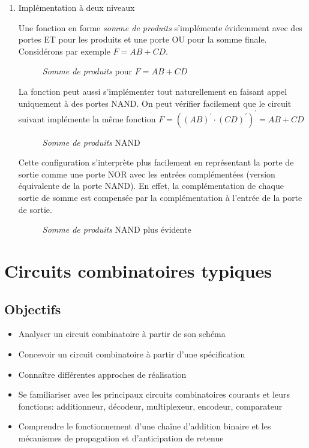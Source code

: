 \documentclass[letter, oneside]{book}
\begin{document}
\begin{enumerate}
\item Implémentation à deux niveaux
\label{sec:orgac7359b}

Une fonction en forme \emph{somme de produits} s'implémente évidemment avec
des portes ET pour les produits et une porte OU pour la somme
finale. Considérons par exemple \(F = AB + CD\).

\begin{figure}[htbp]
\centering

\caption{\label{fig:orgd38b882}\emph{Somme de produits} pour \(F = AB + CD\)}
\end{figure} 

La fonction peut aussi s'implémenter tout naturellement en faisant
appel uniquement à des portes NAND. On peut vérifier facilement que le
circuit suivant implémente la même fonction \(F = ((AB)^\prime \cdot
(CD)^\prime)^\prime = AB + CD\)

\begin{figure}[htbp]
\centering

\caption{\label{fig:org92ddd23}\emph{Somme de produits} NAND}
\end{figure} 

Cette configuration s'interprète plus facilement en représentant la
porte de sortie comme une porte NOR avec les entrées complémentées
(version équivalente de la porte NAND). En effet, la complémentation
de chaque sortie de somme est compensée par la complémentation à
l'entrée de la porte de sortie.

\begin{figure}[htbp]
\centering

\caption{\label{fig:orga889590}\emph{Somme de produits} NAND plus évidente}
\end{figure}
\end{enumerate}

\chapter{Circuits combinatoires typiques}
\label{sec:org7df320b}
\section{Objectifs}
\label{sec:orgc2f0cba}
\begin{itemize}
\item Analyser un circuit combinatoire à partir de son schéma
\item Concevoir un circuit combinatoire à partir d'une spécification
\item Connaître différentes approches de réalisation
\item Se familiariser avec les principaux circuits combinatoires courants et
leurs fonctions: additionneur, décodeur, multiplexeur, encodeur,
comparateur
\item Comprendre le fonctionnement d'une chaîne d'addition binaire et les
mécanismes de propagation et d'anticipation de retenue
\end{itemize}
\end{document}
